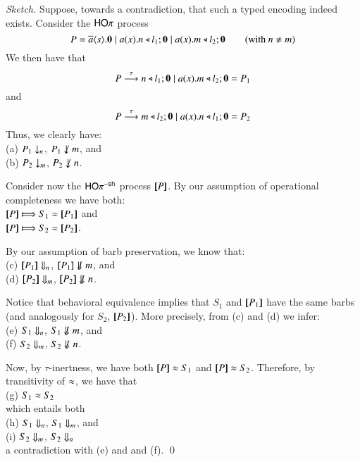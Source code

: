 \begin{proof}[Sketch]
Suppose, towards a contradiction, that such a typed encoding indeed exists. 
Consider the $\mathsf{HO}\pi$ process
$$
P = \overline{a} \langle s \rangle . \mathbf{0} \;|\; a (x) . n \triangleleft l_1 ; \mathbf{0} \;|\; a (x) . m \triangleleft l_2 ; \mathbf{0} \qquad \text{(with $n \neq m$)}
$$
We then have that
$$P \stackrel{\tau}{\longrightarrow} n \triangleleft l_1 ; \mathbf{0} \;|\; a (x) . m \triangleleft l_2 ; \mathbf{0} = P_1$$
and
$$P \stackrel{\tau}{\longrightarrow} m \triangleleft l_2 ; \mathbf{0} \;|\; a (x) . n \triangleleft l_1 ; \mathbf{0} = P_2$$
Thus, we clearly have:\\
(a) $P_1 \downarrow_{n}$, $P_1 \not \barb{m}$, and \\
(b) $P_2 \downarrow_{m}$, $P_2 \not \barb{n}$.

Consider now the $\mathsf{HO}\pi^{\mathsf{-sh}}$ process $[\!\![P]\!\!]$.
By our assumption of operational completeness we have both:\\
$\map{P} \Hby{} S_1 \wb \map{P_1}$
and \\
$\map{P} \Hby{} S_2 \wb \map{P_2}$.

By our assumption of barb preservation, 
we know that: \\
(c) $[\!\![P_1]\!\!] \Downarrow_{n}$, $\map{P_1} \not \Barb{m}$, and \\
(d) $[\!\![P_2]\!\!] \Downarrow_{m}$, $\map{P_2} \not \Barb{n}$.



Notice that behavioral equivalence implies that $S_1$ and $[\!\![P_1]\!\!]$  have the same barbs
(and analogously for $S_2$, $[\!\![P_2]\!\!]$). More precisely, from (c) and (d) we infer: \\
(e) $S_1 \Downarrow_{n}$, $S_1 \not \Barb{m}$, and \\
(f) $S_2 \Downarrow_{m}$, $S_2 \not \Barb{n}$.

Now, by $\tau$-inertness, we have both 
$[\!\![P]\!\!] \approx S_1$ and 
$[\!\![P]\!\!] \approx S_2$.
Therefore, by transitivity of $\approx$, we have that \\
(g) $S_1 \approx S_2$\\
which entails both \\
(h) $S_1 \Downarrow_{n}$, $S_ 1 \Downarrow_{m}$, and \\
(i) $S_2 \Downarrow_{m}$, $S_2 \Downarrow_{n}$ \\
a contradiction with (e) and and (f).
\qed
\end{proof}

